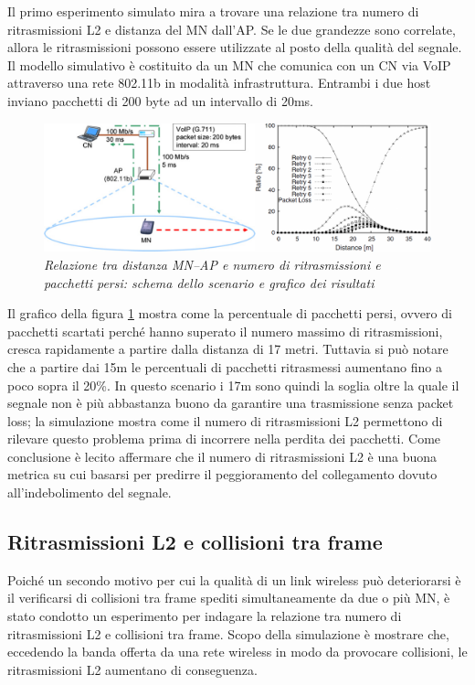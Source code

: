 \documentclass[12pt,a4paper,openright,twoside]{book}
\begin{document}
Il primo esperimento simulato mira a trovare una relazione tra numero
di ritrasmissioni L2 e distanza del MN dall'AP. Se le due grandezze
sono correlate, allora le ritrasmissioni possono essere utilizzate al
posto della qualità del segnale. Il modello simulativo è costituito da
un MN che comunica con un CN via VoIP attraverso una rete 802.11b in
modalità infrastruttura. Entrambi i due host inviano pacchetti di 200
byte ad un intervallo di 20ms.

\begin{figure}[tb]
\centering
\includegraphics[width=\textwidth]{img/mona-distance-signal-strength-simulation}
\caption{\em Relazione tra distanza MN--AP e numero di ritrasmissioni e
  pacchetti persi: schema dello scenario e grafico dei risultati}
\label{fig:mona-distance-signal-strength-simulation}
\end{figure}

Il grafico della figura
\ref{fig:mona-distance-signal-strength-simulation} mostra come la
percentuale di pacchetti persi, ovvero di pacchetti scartati perché
hanno superato il numero massimo di ritrasmissioni, cresca rapidamente
a partire dalla distanza di 17 metri. Tuttavia si può notare che a
partire dai 15m le percentuali di pacchetti ritrasmessi aumentano fino
a poco sopra il 20\%. In questo scenario i 17m sono quindi la soglia
oltre la quale il segnale non è più abbastanza buono da garantire una
trasmissione senza packet loss; la simulazione mostra come il numero
di ritrasmissioni L2 permettono di rilevare questo problema prima di
incorrere nella perdita dei pacchetti. Come conclusione è lecito
affermare che il numero di ritrasmissioni L2 è una buona metrica su
cui basarsi per predirre il peggioramento del collegamento dovuto
all'indebolimento del segnale.

\subsection{Ritrasmissioni L2 e collisioni tra frame}

Poiché un secondo motivo per cui la qualità di un link wireless può
deteriorarsi è il verificarsi di collisioni tra frame spediti
simultaneamente da due o più MN, è stato condotto un esperimento per
indagare la relazione tra numero di ritrasmissioni L2 e collisioni tra
frame. Scopo della simulazione è mostrare che, eccedendo la banda
offerta da una rete wireless in modo da provocare collisioni, le
ritrasmissioni L2 aumentano di conseguenza.
\end{document}
